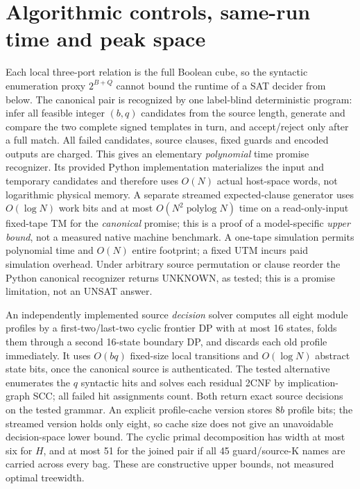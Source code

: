 \documentclass[10pt]{article}
\begin{document}
\section{Algorithmic controls, same-run time and peak space}
\noindent Each local three-port relation is the full Boolean cube, so the syntactic enumeration proxy $2^{B+Q}$ cannot bound the runtime of a SAT decider from below. The canonical pair is recognized by one label-blind deterministic program: infer all feasible integer $(b,q)$ candidates from the source length, generate and compare the two complete signed templates in turn, and accept/reject only after a full match. All failed candidates, source clauses, fixed guards and encoded outputs are charged. This gives an elementary \emph{polynomial} time promise recognizer. Its provided Python implementation materializes the input and temporary candidates and therefore uses $O(N)$ actual host-space words, not logarithmic physical memory. A separate streamed expected-clause generator uses $O(\log N)$ work bits and at most $O(N^2\operatorname{polylog}N)$ time on a read-only-input fixed-tape TM for the \emph{canonical} promise; this is a proof of a model-specific \emph{upper bound}, not a measured native machine benchmark. A one-tape simulation permits polynomial time and $O(N)$ entire footprint; a fixed UTM incurs paid simulation overhead. Under arbitrary source permutation or clause reorder the Python canonical recognizer returns UNKNOWN, as tested; this is a promise limitation, not an UNSAT answer.

\noindent An independently implemented source \emph{decision} solver computes all eight module profiles by a first-two/last-two cyclic frontier DP with at most 16 states, folds them through a second 16-state boundary DP, and discards each old profile immediately. It uses $O(bq)$ fixed-size local transitions and $O(\log N)$ abstract state bits, once the canonical source is authenticated. The tested alternative enumerates the $q$ syntactic hits and solves each residual 2CNF by implication-graph SCC; all failed hit assignments count. Both return exact source decisions on the tested grammar. An explicit profile-cache version stores $8b$ profile bits; the streamed version holds only eight, so cache size does not give an unavoidable decision-space lower bound. The cyclic primal decomposition has width at most six for $H$, and at most 51 for the joined pair if all 45 guard/source-K names are carried across every bag. These are constructive upper bounds, not measured optimal treewidth.
\end{document}
